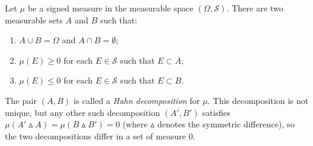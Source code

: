 \documentclass[12pt]{article}
\begin{document}
Let $\mu$ be a signed measure in the measurable space $(\Omega,\mathscr{S})$. There are two measurable sets $A$ and $B$ such that:
\begin{enumerate}
\item $A\cup B = \Omega$ and $A\cap B = \emptyset$;
\item $\mu(E)\geq 0$ for each $E\in\mathscr{S}$ such that $E\subset A$;
\item $\mu(E)\leq 0$ for each $E\in\mathscr{S}$ such that $E\subset B$.
\end{enumerate}

The pair $(A,B)$ is called a \emph{Hahn decomposition} for $\mu$.
This decomposition is not unique, but any other such decomposition $(A',B')$ satisfies $\mu(A'\vartriangle A) = \mu(B\vartriangle B') = 0$ (where $\vartriangle$ denotes the symmetric difference), so the two decompositions differ in a set of measure 0.
\end{document}

